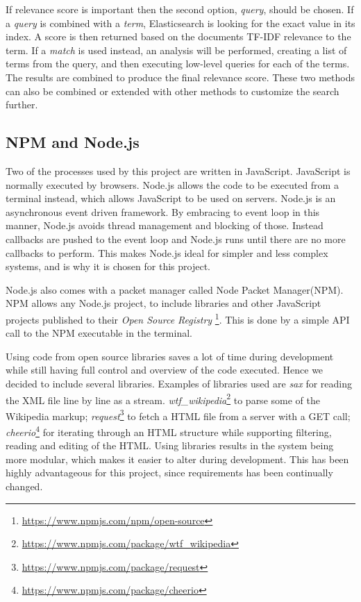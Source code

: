 If relevance score is important then the second option, \textit{query}, should be chosen. If a \textit{query} is combined with a \textit{term}, Elasticsearch is looking for the exact value in its index. A score is then returned based on the documents TF-IDF relevance to the term. If a \textit{match} is used instead, an analysis will be performed, creating a list of terms from the query, and then executing low-level queries for each of the terms. The results are combined to produce the final relevance score. These two methods can also be combined or extended with other methods to customize the search further.


\subsection{NPM and Node.js}
Two of the processes used by this project are written in JavaScript. JavaScript is normally executed by browsers. Node.js\cite{node} allows the code to be executed from a terminal instead, which allows JavaScript to be used on servers.  Node.js is an asynchronous event driven framework. By embracing to event loop in this manner, Node.js avoids thread management and blocking of those. Instead callbacks are pushed to the event loop and Node.js runs until there are no more callbacks to perform. This makes Node.js ideal for simpler and less complex systems, and is why it is chosen for this project.

Node.js also comes with a packet manager called Node Packet Manager(NPM). NPM allows any Node.js project, to include libraries and other JavaScript projects published to their \textit{Open Source Registry} \footnote{\url{https://www.npmjs.com/npm/open-source}}. This is done by a simple API call to the NPM executable in the terminal. %

Using code from open source libraries saves a lot of time during development while still having full control and overview of the code executed. Hence we decided to include several libraries. Examples of libraries used are \textit{sax} for reading the XML file line by line as a stream.  \textit{wtf\_wikipedia}\footnote{\url{https://www.npmjs.com/package/wtf_wikipedia}} to parse some of the Wikipedia markup;  \textit{request}\footnote{\url{https://www.npmjs.com/package/request}} to fetch a HTML file from a server with a GET call;  \textit{cheerio}\footnote{\url{https://www.npmjs.com/package/cheerio}} for iterating through an HTML structure while supporting filtering, reading and editing of the HTML. Using libraries results in the system being more modular, which makes it easier to alter during development. This has been highly advantageous for this project, since requirements has been continually changed. 

